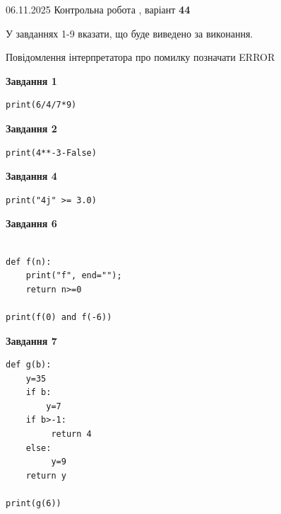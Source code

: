 \documentclass[12pt, ukrainian]{article}
\begin{document}
{\Large{06.11.2025 Контрольна робота , варіант  \No \textbf { 44 }\par}}
{
\begin {large}
У завданнях 1-9 вказати, що буде виведено за виконання.

Повідомлення інтерпретатора про помилку позначати ERROR

\begin{minipage}[t]{7.5cm}

\begin{center}
\textbf{Завдання 1}
\end{center}

\begin{verbatim}
print(6/4/7*9)
\end{verbatim}



\begin{center}
\textbf{Завдання 2}
\end{center}

\begin{verbatim}
print(4**-3-False)
\end{verbatim}



\begin{center}
\textbf{Завдання 4}
\end{center}

\begin{verbatim}
print("4j" >= 3.0)
\end{verbatim}



\begin{center}
\textbf{Завдання 6}
\end{center}

\begin{verbatim}

def f(n):
    print("f", end="");
    return n>=0

print(f(0) and f(-6))
\end{verbatim}



\begin{center}
\textbf{Завдання 7}
\end{center}

\begin{verbatim}
def g(b):
    y=35
    if b: 
        y=7
    if b>-1:
         return 4
    else:
         y=9
    return y

print(g(6))
\end{verbatim}


\end{minipage}
\end{large}}
\end{document}
